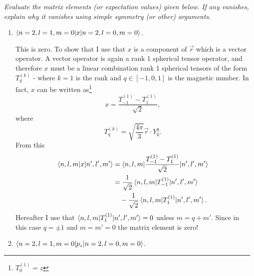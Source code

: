 \begin{example}
	\label{sec:hydrogenmat}
	\emph{Evaluate the matrix elements (or expectation values) given below. If any vanishes, explain why it vanishes using simple symmetry (or other) arguments.}\newline
	\begin{enumerate}
		\item $\braket{n=2,l=1,m=0|x|n=2,l=0,m=0}$. \newline
		
		This is zero. To show that I use that $x$ is a component of $\vec{r}$ which is a vector operator. A vector operator is again a rank 1 spherical tensor operator, and therefore $x$ must be a linear combination rank 1 spherical tensors of the form $T_q^{(k)}$ - where $k=1$ is the rank and $q\in[-1,0,1]$ is the magnetic number. In fact, $x$ can be written as\footnote{$T_{0}^{(1)}=z$}
		\begin{equation}
			x=\frac{T_{-1}^{(1)}-T_1^{(1)}}{\sqrt{2}},
		\end{equation} 
		where
		\begin{equation}
			T_{q}^{(k)}=\sqrt{\frac{4\pi}{3}}\vec{r}\cdot Y_k^q.
		\end{equation} 
		From this
		\begin{equation}
			\begin{split}
				\braket{n,l,m|x|n',l',m'}&=\braket{n,l,m|\frac{T_{-1}^{(1)}-T_1^{(1)}}{\sqrt{2}}|n',l',m'}\\
				&=\frac{1}{\sqrt{2}}\braket{n,l,m|T_{-1}^{(1)}|n',l',m'}\\
				&\quad -\frac{1}{\sqrt{2}}\braket{n,l,m|T_{1}^{(1)}|n',l',m'}.
			\end{split}
		\end{equation} 
		Hereafter I use that $\braket{n,l,m|T_{1}^{(1)}|n',l',m'}=0$ unless $m=q+m'$. Since in this case $q=\pm1$ and $m=m'=0$ the matrix element is zero! \newline
		
		\item $\braket{n=2,l=1,m=0|p_z|n=2,l=0,m=0}$. \newline
		

\end{enumerate}
\end{example}
